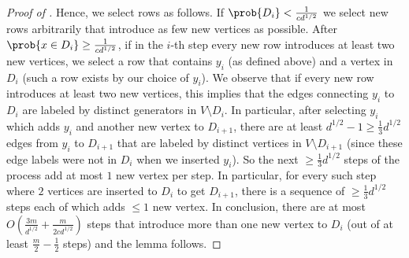 \begin{proof}[Proof of ]
    Hence, we select rows as follows. If \(\prob{D_i} < \frac{1}{c d^{1/2}}\) we select new rows arbitrarily that introduce as few new vertices as possible. After \(\prob{x\in D_i} \ge \frac{1}{c d^{1/2}}\), if in the \(i\)-th step every new row introduces at least two new vertices, we select a row that contains \(y_i\) (as defined above) and a vertex in \(D_i\) (such a row exists by our choice of \(y_i\)). We observe that if every new row introduces at least two new vertices, this implies that the edges connecting \(y_i\) to $D_i$ are labeled by distinct generators in \(V \setminus D_i\). In particular, after selecting \(y_i\) which adds \(y_i\) and another new vertex to \(D_{i+1}\), there are at least \(d^{1/2} - 1 \geq \frac{1}{3} d^{1/2}\) edges from \(y_i\) to \(D_{i+1}\) that are labeled by distinct vertices in \(V \setminus D_{i+1}\) (since these edge labels were not in \(D_i\) when we inserted \(y_i\)). So the next $\ge \frac{1}{3}d^{1/2}$ steps of the process add at most $1$ new vertex per step. In particular, for every such step where \(2\) vertices are inserted to \(D_i\) to get \(D_{i+1}\), there is a sequence of \(\geq \frac{1}{3}d^{1/2}\) steps each of which adds  \(\le 1\) new vertex. In conclusion, there are at most \(O(\frac{3m}{d^{1/2}} + \frac{m}{2c d^{1/2}})\)  steps that introduce more than one new vertex to \(D_i\) (out of at least \(\frac{m}{2}-\frac{1}{2}\) steps) and the lemma follows.
\end{proof}
